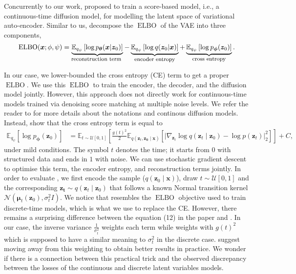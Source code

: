 Concurrently to our work, \citet{vahdat2021score} proposed to train a score-based model, i.e., a continuous-time diffusion model, for modelling the latent space of variational auto-encoder. Similar to us, \citet{vahdat2021score} decompose the $\operatorname{ELBO}$ of the VAE into three components,
\begin{align}
  \operatorname{ELBO}(\mathbf{x}; \phi, \psi) =
  \underbrace{\mathbb{E}_{q_\psi}\left[ \log p_{\mathbf{\theta}}(\mathbf{x}|\mathbf{z}_0)\right]}_{\text{\footnotesize reconstruction term }} -
  \underbrace{\mathbb{E}_{q_\psi}\left[\log q(\mathbf{z}_0|\mathbf{x})\right]}_{\text{\footnotesize{encoder entropy}}} +
  \underbrace{\mathbb{E}_{q_\psi}\left[\log p_{\mathbf{\phi}}(\mathbf{z}_0)\right]}_{\text{\footnotesize{cross entropy}}}.
\end{align}

In our case, we lower-bounded the cross entropy (CE) term to get a proper $\operatorname{ELBO}$. We use this $\operatorname{ELBO}$ to train the encoder, the decoder, and the diffusion model jointly. However, this approach does not directly work for continuous-time models trained via denoising score matching at multiple noise levels. We refer the reader to  for more details about the notations and continous diffusion models. Instead, \citet{vahdat2021score} show that the cross entropy term is equal to
\begin{align}
  \mathbb{E}_{q_\psi}\left[\log p_{\mathbf{\phi}}(\mathbf{z}_0)\right] &= \mathbb{E}_{t \sim \mathcal{U}\left[0, 1\right]}\left[ \frac{g(t)^2}{2} \mathbb{E}_{q(\bm{z}_t, \bm{z_0} \mid \bm{x})}\left[ \lvert \nabla_{\bm{z}_t} \log q(\bm{z}_t \mid \bm{z}_0) - \log p(\bm{z}_t) \rvert_2^2 \right] \right] + C, \label{eq:CE_continuous_diffusion_bis}
\end{align}
under mild conditions. The symbol $t$ denotes the time; it starts from $0$ with structured data and ends in $1$ with noise. We can use stochastic gradient descent to optimise this term, the encoder entropy, and reconstruction terms jointly. In order to evaluate , we first encode the sample ($q(\bm{z}_0 \mid \bm{x})$), draw $t\sim \mathcal{U}\left[0, 1\right]$ and the corresponding $\bm{z_t} \sim q(\bm{z}_t \mid \bm{z}_0)$ that follows a known Normal transition kernel $\mathcal{N}\left( \bm{\mu}_t(\bm{z}_0), \sigma_t^2 I \right)$. We notice that  resembles the $\operatorname{ELBO}$ objective used to train discrete-time models, which is what we use to replace the CE. However, there remains a surprising difference between the equation (12) in the paper and . In our case, the inverse variance $\frac{1}{\sigma_t^2}$ weights each term while  weights with $g(t)^2$ which is supposed to have a similar meaning to $\sigma_t^2$ in the discrete case. \citet{vahdat2021score} suggest moving away from this weighting to obtain better results in practice. We wonder if there is a connection between this practical trick and the observed discrepancy between the losses of the continuous and discrete latent variables models.

